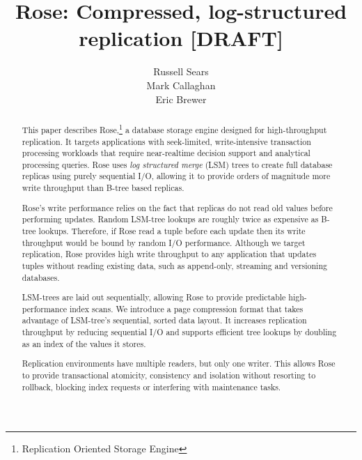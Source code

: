 \documentclass{vldb}
\newcommand{\rows}{Rose\xspace}
\newcommand{\rowss}{Rose's\xspace}
\begin{document}
\title{{\ttlit \rows}: Compressed, log-structured replication [DRAFT]}
%
%
\author{
\alignauthor
Russell Sears\\
\alignauthor
Mark Callaghan\\
\alignauthor
Eric Brewer\\
}
\maketitle
\begin{abstract}
This paper describes \rows,\footnote{Replication Oriented Storage
  Engine} a database storage engine designed for high-throughput
replication.  It targets applications with seek-limited,
write-intensive transaction processing workloads that require
near-realtime decision support and analytical processing queries.
\rows uses {\em log structured merge} (LSM) trees to create full
database replicas using purely sequential I/O, allowing it to provide
orders of magnitude more write throughput than B-tree based replicas.

\rowss write performance relies on the fact that replicas do not
read old values before performing updates.  Random LSM-tree lookups are
roughly twice as expensive as B-tree lookups.  Therefore, if \rows
read a tuple before each update then its write throughput would be
bound by random I/O performance.  Although we target replication, \rows provides
high write throughput to any application that updates tuples
without reading existing data, such as append-only, streaming and
versioning databases.

LSM-trees are laid out sequentially, allowing \rows to provide
predictable high-performance index scans.  We introduce a page
compression format that takes advantage of LSM-tree's sequential,
sorted data layout.  It increases replication throughput by reducing
sequential I/O and supports efficient tree lookups by doubling as an
index of the values it stores.

Replication environments have multiple readers, but only one writer.
This allows \rows to provide transactional atomicity, consistency and
isolation without resorting to rollback, blocking index requests or
interfering with maintenance tasks.


\end{abstract}
\end{document}
